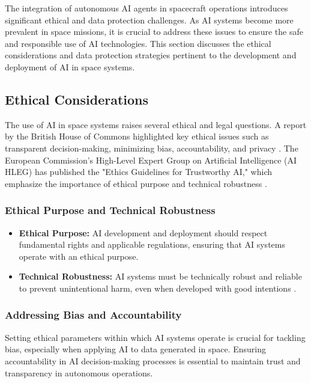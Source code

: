 \documentclass[a4paper, 11pt]{article}
\begin{document}
The integration of autonomous AI agents in spacecraft operations introduces significant ethical and data protection challenges. As AI systems become more prevalent in space missions, it is crucial to address these issues to ensure the safe and responsible use of AI technologies. This section discusses the ethical considerations and data protection strategies pertinent to the development and deployment of AI in space systems.

\subsection{Ethical Considerations}

The use of AI in space systems raises several ethical and legal questions. A report by the British House of Commons highlighted key ethical issues such as transparent decision-making, minimizing bias, accountability, and privacy \cite{house_of_commons_report}. The European Commission's High-Level Expert Group on Artificial Intelligence (AI HLEG) has published the "Ethics Guidelines for Trustworthy AI," which emphasize the importance of ethical purpose and technical robustness \cite{ai_hleg_guidelines}.

\subsubsection{Ethical Purpose and Technical Robustness}

\begin{itemize}
    \item \textbf{Ethical Purpose:} AI development and deployment should respect fundamental rights and applicable regulations, ensuring that AI systems operate with an ethical purpose.
    \item \textbf{Technical Robustness:} AI systems must be technically robust and reliable to prevent unintentional harm, even when developed with good intentions \cite{ai_hleg_guidelines}.
\end{itemize}

\subsubsection{Addressing Bias and Accountability}

Setting ethical parameters within which AI systems operate is crucial for tackling bias, especially when applying AI to data generated in space. Ensuring accountability in AI decision-making processes is essential to maintain trust and transparency in autonomous operations.
\end{document}
